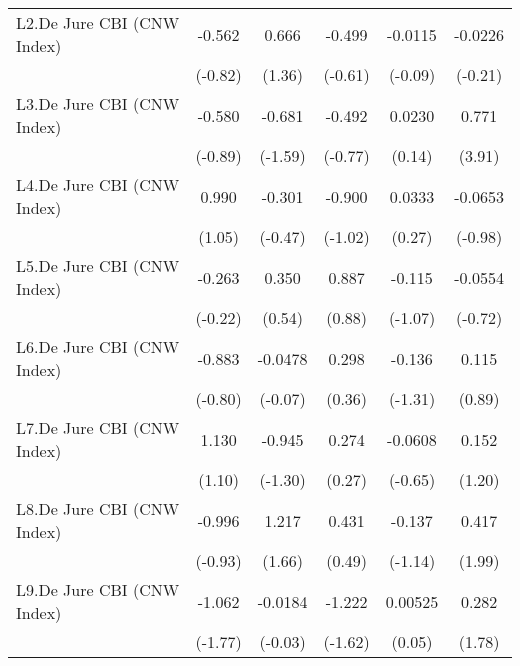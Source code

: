 {\begin{longtable}{l*{5}{c}}
\addlinespace
L2.De Jure CBI (CNW Index)&   -0.562         &    0.666         &   -0.499         &  -0.0115         &  -0.0226         \\
                &  (-0.82)         &   (1.36)         &  (-0.61)         &  (-0.09)         &  (-0.21)         \\
\addlinespace
L3.De Jure CBI (CNW Index)&   -0.580         &   -0.681         &   -0.492         &   0.0230         &    0.771\sym{***}\\
                &  (-0.89)         &  (-1.59)         &  (-0.77)         &   (0.14)         &   (3.91)         \\
\addlinespace
L4.De Jure CBI (CNW Index)&    0.990         &   -0.301         &   -0.900         &   0.0333         &  -0.0653         \\
                &   (1.05)         &  (-0.47)         &  (-1.02)         &   (0.27)         &  (-0.98)         \\
\addlinespace
L5.De Jure CBI (CNW Index)&   -0.263         &    0.350         &    0.887         &   -0.115         &  -0.0554         \\
                &  (-0.22)         &   (0.54)         &   (0.88)         &  (-1.07)         &  (-0.72)         \\
\addlinespace
L6.De Jure CBI (CNW Index)&   -0.883         &  -0.0478         &    0.298         &   -0.136         &    0.115         \\
                &  (-0.80)         &  (-0.07)         &   (0.36)         &  (-1.31)         &   (0.89)         \\
\addlinespace
L7.De Jure CBI (CNW Index)&    1.130         &   -0.945         &    0.274         &  -0.0608         &    0.152         \\
                &   (1.10)         &  (-1.30)         &   (0.27)         &  (-0.65)         &   (1.20)         \\
\addlinespace
L8.De Jure CBI (CNW Index)&   -0.996         &    1.217         &    0.431         &   -0.137         &    0.417\sym{*}  \\
                &  (-0.93)         &   (1.66)         &   (0.49)         &  (-1.14)         &   (1.99)         \\
\addlinespace
L9.De Jure CBI (CNW Index)&   -1.062         &  -0.0184         &   -1.222         &  0.00525         &    0.282         \\
                &  (-1.77)         &  (-0.03)         &  (-1.62)         &   (0.05)         &   (1.78)         \\

\end{longtable}}
